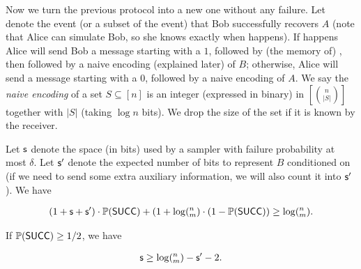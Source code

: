 


 
Now we turn the previous protocol into a new one without any failure. Let \success denote the event (or a subset of the event) that Bob successfully recovers $A$ (note that Alice can simulate Bob, so she knows exactly when \success happens). If \success happens Alice will send Bob a message starting with a $1$, followed by (the memory of) \samp, then followed by a naive encoding (explained later) of $B$; otherwise, Alice will send a message starting with a $0$, followed by a naive encoding of $A$. We say the {\em naive encoding} of a set $S\subseteq [n]$ is an integer (expressed in binary) in $[{n \choose |S|}]$ together with $|S|$ (taking $\log n$ bits). We drop the size of the set if it is known by the receiver.

\begin{lemma} \label{lemma:lb-meta}
  Let $\textsf{s}$ denote the space (in bits) used by a sampler with failure probability at most $\delta$. Let $\textsf{s}'$ denote the expected number of bits to represent $B$ conditioned on \success (if we need to send some extra auxiliary information, we will also count it into $\textsf{s}'$). We have 
  
  \begin{align}
  (1+\textsf{s}+\textsf{s}')\cdot \operatorname*{\mathbb{P}}(\textsf{SUCC})+(1+\log(^n_m) \cdot (1-\operatorname*{\mathbb{P}}(\textsf{SUCC})) \ge \log (^n_m).
  \end{align} 
  
  If $\operatorname*{\mathbb{P}}(\textsf{SUCC})\ge 1/2$, we have 
  
  \begin{align} \label{eqn:lb-meta}
  \textsf{s}\ge \log (^n_m) - \textsf{s}' - 2.
  \end{align} 
\end{lemma}

